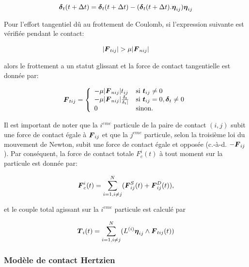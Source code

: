 \begin{equation} \label{eq: 15}
\boldsymbol{\delta}_t(t + \Delta t) =  \boldsymbol{\delta}_t(t + \Delta t) - (\boldsymbol{\delta}_t(t + \Delta t).\boldsymbol{\eta}_{ij}) \boldsymbol{\eta}_{ij}
\end{equation}

Pour l'effort tangentiel dû au frottement de Coulomb, si l'expression suivante est vérifiée pendant le contact:

\begin{equation} \label{eq: 16}
|\boldsymbol{F}_{tij}| > \mu |\boldsymbol{F}_{nij}|
\end{equation}

\noindent alors le frottement a un statut glissant et la force de contact tangentielle est donnée par:

\begin{equation} \label{eq: 17}
\boldsymbol{F}_{tij} = \left\{
    \begin{array}{ll}
        - \mu |\boldsymbol{F}_{nij}|t_{ij} & \mbox{si } \boldsymbol{t}_{ij} \ne 0 \\
        - \mu |\boldsymbol{F}_{nij}|\frac{\delta_t}{\delta_t|} & \mbox{si } \boldsymbol{t}_{ij} = 0, \boldsymbol{\delta}_t \ne 0 \\
        0 & \mbox{sinon.}
    \end{array}
\right.
\end{equation}

Il est important de noter que la $i^{eme}$ particule de la paire de contact $(i,j)$ subit une force de contact égale à $\boldsymbol{F}_{ij}$ et que la $j^{eme}$ particule, selon la troisième loi du mouvement de Newton, subit une force de contact égale et opposée (c.-à-d. $-\boldsymbol{F}_{ij}$). Par conséquent, la force de contact totale $F^i_{c}(t)$ à tout moment sur la particule est donnée par:

\begin{equation} \label{eq: 18}
\boldsymbol{F}^i_{c}(t) = \sum_{i=1,i \ne j}^N (\boldsymbol{F}^S_{ij}(t) + \boldsymbol{F}^D_{ij}(t)), 
\end{equation}

et le couple total agissant sur la $i^{eme}$ particule est calculé par

\begin{equation} \label{eq: 19}
\boldsymbol{T}_{i}(t) = \sum_{i=1,i \ne j}^N (L^{(i)} \boldsymbol{\eta}_{ij} \wedge \boldsymbol{F}_{tij}(t))
\end{equation}

\subsubsection{Modèle de contact Hertzien}

